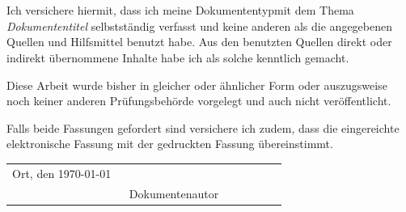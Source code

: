 \documentclass[german,a4paper,12pt]{article}
\newcommand{\doctitle}{Dokumententitel}
\newcommand{\doctype}{Dokumententyp}
\newcommand{\docauthor}{Dokumentenautor}
\begin{document}
\section*{}
Ich versichere hiermit, dass ich meine \doctype mit dem Thema \textit{\glqq\doctitle\grqq} selbstständig verfasst und keine anderen als die angegebenen Quellen und Hilfsmittel benutzt habe. Aus den benutzten Quellen direkt oder indirekt übernommene Inhalte habe ich als solche kenntlich gemacht. \par
Diese Arbeit wurde bisher in gleicher oder ähnlicher Form oder auszugsweise noch keiner anderen Prüfungsbehörde vorgelegt und auch nicht veröffentlicht. \par
Falls beide Fassungen gefordert sind versichere ich zudem, dass die eingereichte elektronische Fassung mit der gedruckten Fassung übereinstimmt. \par
\vspace{70pt}
\begin{table}[H]\begin{tabular}{@{}p{0.4\linewidth}P{0.545\linewidth}@{}}
Ort, den \today     	& \hrulefill\\
						& \vspace{1pt}\docauthor\\
\end{tabular}\end{table}
\vspace*{\fill+50pt}
\newpage
\vspace*{\fill}
\section*{}
\blindtext
\vspace*{\fill}
\newpage
\tableofcontents
\newpage
\listoffigures
\newpage
\newpage
{}\setcounter{page}{1}
\end{document}
